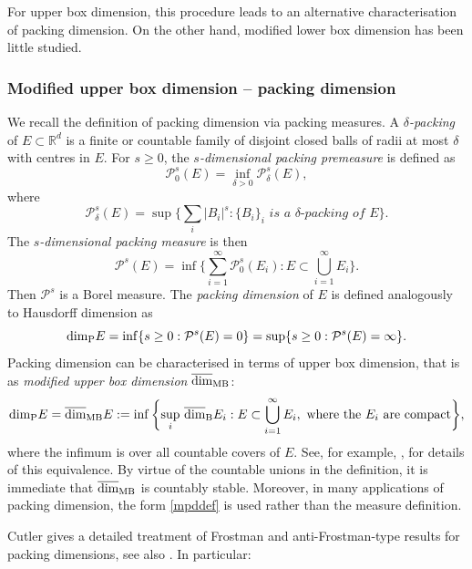 \documentclass[12pt]{article}
\newcommand{\1}{{\bf 1}}
\newcommand\ubd{\overline{\mbox{\rm dim}}_{\rm B}} %
\newcommand\pkd{\mbox{\rm dim}_{\rm P}} %
\newcommand\mubd{\overline{\mbox{\rm dim}}_{\rm MB}} %
\newcommand{\R}{\mathbb{R}}
\begin{document}
For upper box dimension, this procedure leads to an alternative characterisation of packing dimension. On the other hand, modified lower box dimension has been little studied.

\subsubsection{Modified upper box dimension -- packing dimension}

We recall the definition of packing dimension via packing measures. A $\delta${\it-packing} of $E\subset \R^d$ is a finite or countable family of disjoint closed balls of radii at most $\delta$  with centres in $E$. For $s\geq 0$, the {\it $s$-dimensional packing premeasure} is defined as	
\begin{equation*}
	\mathcal{P}_0^s(E)=\inf_{\delta>0}{\mathcal P}_\delta^s(E),
\end{equation*}
	where
\begin{equation*}
		\mathcal{P}_\delta^s(E)=\sup\Big\{ \sum_i |B_i|^s:\{B_i\}_i \textit{ is  a $\delta$-packing of  $E$}\Big\}.
\end{equation*}
	The {\it $s$-dimensional packing measure} is then
\begin{equation*}
		\mathcal{P}^s(E)=\inf\bigg\{ \sum_{i=1}^\infty	\mathcal{P}_0^s(E_i): E\subset \bigcup_{i=1}^\infty E_i\bigg\}.
		\end{equation*}
Then $\mathcal{P}^s$ is a Borel measure.		
The {\it  packing dimension} of $E$ is defined analogously to Hausdorff dimension as
\begin{equation*}
	\pkd E=\inf\{  s\geq0: \mathcal{P}^s(E)=0\}=\sup\{ s\geq 0: \mathcal{P}^s(E)=\infty\}.
	\end{equation*}	
Packing dimension can be  characterised in terms of upper box dimension, that is as {\it modified upper box dimension} $\mubd$:
\begin{equation}\label{mpddef}
	\pkd E=\mubd E:= \inf\bigg\{{\sup_i }  \ \ubd E_i: E\subset \bigcup_{i=1}^\infty E_i, \text{ where the } E_i \text{ are compact} \bigg\},
\end{equation}
where the infimum is over all countable covers of $E$.
See, for example, \cite{FaBk,Tri}, for details of this equivalence. By virtue of the countable unions in the definition, it is immediate that $\mubd$ is countably stable. Moreover, in many applications of packing dimension, the form \eqref{mpddef} is used rather than the measure definition.

Cutler \cite{Cu} gives a detailed treatment of Frostman and anti-Frostman-type results for packing dimensions, see also \cite[Chapter 2]{Fa3}. In particular:
\end{document}
